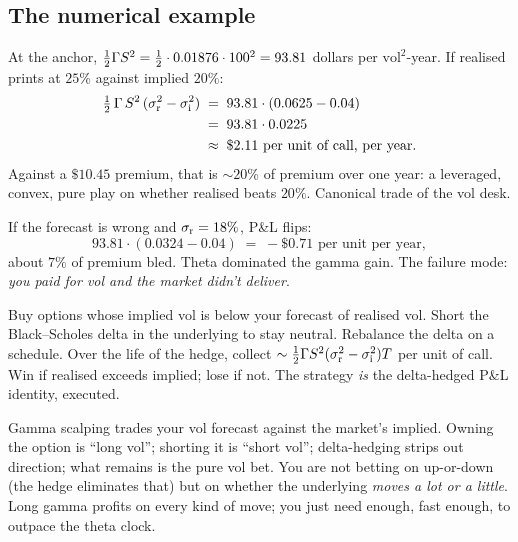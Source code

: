 \subsection{The numerical example}
\label{subsec:ch17_gs_numbers}

At the anchor, $\tfrac12 \Gamma S^2 = \tfrac12 \cdot 0.01876
\cdot 100^2 = 93.81$ dollars per $\text{vol}^2$-year. If realised
prints at $25\%$ against implied $20\%$:
\begin{align*}
  \tfrac12\,\Gamma\,S^2\,(\sigma_{\text{r}}^2 - \sigma_{\text{i}}^2)
  \;&=\; 93.81 \cdot (0.0625 - 0.04) \\
  \;&=\; 93.81 \cdot 0.0225 \\
  \;&\approx\; \$2.11 \text{ per unit of call, per year}.
\end{align*}
Against a $\$10.45$ premium, that is $\sim 20\%$ of premium over
one year: a leveraged, convex, pure play on whether realised
beats $20\%$. Canonical trade of the vol desk.

If the forecast is wrong and $\sigma_{\text{r}} = 18\%$, P\&L
flips:
\begin{equation*}
  93.81 \cdot (0.0324 - 0.04) \;=\; -\$0.71 \text{ per unit per year},
\end{equation*}
about $7\%$ of premium bled. Theta dominated the gamma gain. The
failure mode: \emph{you paid for vol and the market didn't
deliver}.

\begin{keyfactbox}
Buy options whose implied vol is below your forecast of realised
vol. Short the Black--Scholes delta in the underlying to stay
neutral. Rebalance the delta on a schedule. Over the life of the
hedge, collect $\sim \tfrac12 \Gamma S^2
(\sigma_{\text{r}}^2 - \sigma_{\text{i}}^2) T$ per unit of
call. Win if realised exceeds implied; lose if not. The strategy
\emph{is} the delta-hedged P\&L identity, executed.
\end{keyfactbox}

\begin{intuitionbox}
Gamma scalping trades your vol forecast against the market's
implied. Owning the option is ``long vol''; shorting it is ``short
vol''; delta-hedging strips out direction; what remains is the
pure vol bet. You are not betting on up-or-down (the hedge
eliminates that) but on whether the underlying \emph{moves a
lot or a little}. Long gamma profits on every kind of move; you
just need enough, fast enough, to outpace the theta clock.
\end{intuitionbox}

